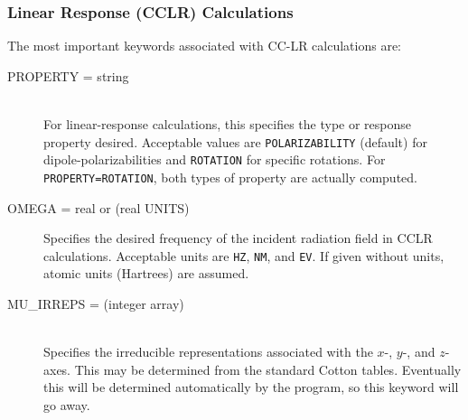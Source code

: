 \subsubsection{Linear Response (CCLR) Calculations}
The most important keywords associated with CC-LR calculations are:
\begin{description}
\item[PROPERTY = string]\mbox{}\\
For linear-response calculations, this specifies the type or response
property desired.  Acceptable values are {\tt POLARIZABILITY} (default) for
dipole-polarizabilities and {\tt ROTATION} for specific rotations.  For 
{\tt PROPERTY=ROTATION}, both types of property are actually computed.
\item[OMEGA = real or (real UNITS)]\mbox{}
Specifies the desired frequency of the incident radiation field in CCLR
calculations.  Acceptable units are {\tt HZ}, {\tt NM}, and {\tt EV}.  If
given without units, atomic units (Hartrees) are assumed.
\item[MU\_IRREPS = (integer array)]\mbox{}\\
Specifies the irreducible representations associated with the $x$-, $y$-,
and $z$-axes.  This may be determined from the standard Cotton tables. 
Eventually this will be determined automatically by the program, so this
keyword will go away.
\end{description}
